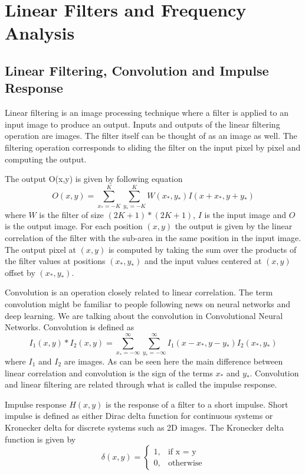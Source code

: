 \documentclass[]{article}
\begin{document}
\section{Linear Filters and Frequency Analysis}
\label{linear-filters-and-frequency-analysis}

\subsection{Linear Filtering, Convolution and Impulse Response}
\label{linear-filtering}

Linear filtering is an image processing technique where a filter is applied to
an input image to produce an output. Inputs and outputs of the linear filtering
operation are images. The filter itself can be thought of as an image as well.
The filtering operation corresponds to sliding the filter on the input pixel by
pixel and computing the output. 

The output O(x,y) is given by following equation
\begin{equation}
  O(x,y) = \sum_{x_*=-K}^{K}\sum_{y_*=-K}^{K}{W(x_*,y_*)I(x+x_*,y+y_*)}
\end{equation}
where $W$ is the filter of size $(2K+1)*(2K+1)$, $I$ is the input image and $O$
is the output image. For each position $(x,y)$ the output is given by the
linear correlation of the filter with the sub-area in the same position in the
input image. The output pixel at $(x,y)$ is computed by taking the sum over the
products of the filter values at positions $(x_*,y_*)$ and the input values
centered at $(x,y)$ offset by $(x_*,y_*)$.

Convolution is an operation closely related to linear correlation. The term
convolution might be familiar to people following news on neural networks and
deep learning. We are talking about the convolution in Convolutional Neural
Networks. Convolution is defined as
\begin{equation}
  I_1(x,y) \ast I_2(x,y) = \sum_{x_*=-\infty}^{\infty}\sum_{y_*=-\infty}^{\infty}{I_1(x-x_*,y-y_*)I_2(x_*,y_*)}
\end{equation}
where $I_1$ and $I_2$ are images. As can be seen here the main difference
between linear correlation and convolution is the sign of the terms $x_*$ and
$y_*$. Convolution and linear filtering are related through what is called the
impulse response.

Impulse response $H(x,y)$ is the response of a filter to a short impulse. Short
impulse is defined as either Dirac delta function for continuous systems or
Kronecker delta for discrete systems such as 2D images. The Kronecker delta
function is given by
\begin{equation}
  \delta(x,y) = \begin{cases}
    1, & \text{if x = y}\\
    0, & \text{otherwise}
  \end{cases}
\end{equation}
\end{document}
